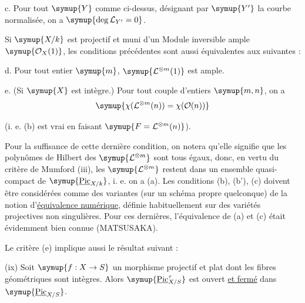 \noindent c. Pour tout $\symup{Y}$ comme ci-dessus, désignant par $\symup{Y'}$ la courbe
normalisée, on a $\symup{\deg\mathcal L_{Y'}=0}$.

Si $\symup{X/k}$ est projectif et muni d'un Module inversible ample
$\symup{\mathcal O_X(1)}$, les conditions précédentes sont aussi équivalentes aux
suivantes :

\noindent d. Pour tout entier $\symup{m}$, $\symup{\mathcal L^{\otimes m}(1)}$ est ample.

\noindent e. (Si $\symup{X}$ est intègre.) Pour tout couple d'entiers $\symup{m,n}$, on a
\[
\symup{\chi(\mathcal L^{\otimes m}(n))=\chi(\mathcal O(n))}
\]

(i. e. (b) est vrai en faisant $\symup{F=\mathcal L^{\otimes m}(n)}$).

Pour la suffisance de cette dernière condition, on notera qu'elle signifie que
les polynômes de Hilbert des $\symup{\mathcal L^{\otimes m}}$ sont tous égaux, donc,
en vertu du critère de Mumford (iii), les $\symup{\mathcal L^{\otimes m}}$ restent
dans un ensemble quasi-compact de $\symup{\underline{\operatorname{Pic}}_{X/k}}$, i. e. on a (a).
Les conditions (b), (b'), (c) doivent être considérées comme des variantes
(sur un schéma propre quelconque) de la notion d'\uline{équivalence numérique}, définie
habituellement sur des variétés projectives non singulières. Pour ces
dernières, l'équivalence de (a) et (c) était évidemment bien connue
(MATSUSAKA).

Le critère (e) implique aussi le résultat suivant :

\medskip
\noindent(ix) Soit $\symup{f:X\to  S}$ un morphisme projectif et plat dont
les fibres géométriques sont intègres. Alors
$\symup{\underline{\operatorname{Pic}}_{X/S}^\tau}$ est ouvert \uline{et fermé} dans
$\symup{\underline{\operatorname{Pic}}_{X/S}}$.

